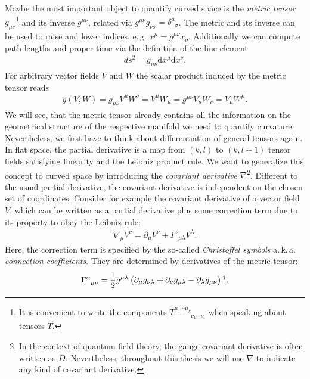 Maybe the most important object to quantify curved space is the \textit{metric tensor} $g_{\mu\nu}$\footnote{It is convenient to write the components $T_{\phantom{\mu_{1} \cdots \mu_{k}}\nu_{1} \cdots \nu_{l}}^{\mu_{1} \cdots \mu_{k}}$ when speaking about tensors $T$.} and its inverse  $g^{\mu\nu}$, related via $g^{\mu\nu}g_{\nu\sigma} = \delta^{\mu}_{\phantom{\mu}\sigma}$. The metric and its inverse can be used to raise and lower indices, e.\,g. $x^{\mu} = g^{\mu\nu}x_{\nu}$. Additionally we can compute path lengths and proper time via the definition of the line element 
\begin{align}
	d s^{2}=g_{\mu \nu} \mathrm{d} x^{\mu} \mathrm{d} x^{\nu}.
\end{align}
For arbitrary vector fields $V$ and $W$ the scalar product induced by the metric tensor reads
\begin{align}
	g(V,W) = g_{\mu\nu}V^{\mu}W^{\nu} = V^{\mu}W_{\mu}= g^{\mu\nu}V_{\mu}W_{\nu} = V_{\mu}W^{\mu}.
\end{align}
We will see, that the metric tensor already contains all the information on the geometrical structure of the respective manifold we need to quantify curvature. Nevertheless, we first have to think about differentiation of general tensors again. \\
In flat space, the partial derivative is a map from $(k, l)$ to $(k, l+1)$ tensor fields satisfying linearity and the Leibniz product rule. We want to generalize this concept to curved space by introducing the \textit{covariant derivative} $\nabla$\footnote{In the context of quantum field theory, the gauge covariant derivative is often written as $D$. Nevertheless, throughout this thesis we will use $\nabla$ to indicate any kind of covariant derivative.}. Different to the usual partial derivative, the covariant derivative is independent on the chosen set of coordinates. Consider for example the covariant derivative of a vector field $V$, which can be written as a partial derivative plus some correction term due to its property to obey the Leibniz rule:
\begin{align}
\nabla_{\mu} V^{\nu}=\partial_{\mu} V^{\nu}+\Gamma_{\phantom{\nu}\mu \lambda}^{\nu} V^{\lambda}.
\label{eqn:cov_deriv}
\end{align}
Here, the correction term is specified by the so-called \textit{Christoffel symbols} a.\,k.\,a. \textit{connection coefficients}. They are determined by derivatives of the metric tensor:  
\begin{align}
\Gamma_{\phantom{\alpha}\mu \nu}^{\alpha}=\frac{1}{2} g^{\mu \lambda}\left(\partial_{\mu} g_{\nu \lambda}+\partial_{\nu} g_{\mu \lambda}-\partial_{\lambda} g_{\mu \nu}\right)\footnotemark.	
\end{align}
